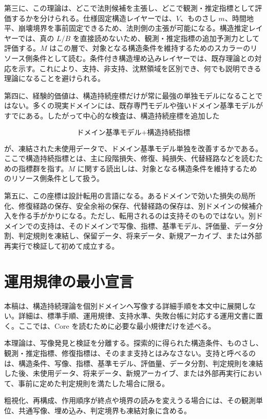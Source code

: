 \documentclass[12pt,a4paper]{article}
\begin{document}
第三に、この理論は、どこで法則候補を主張し、どこで観測・推定指標として評価するかを分けられる。仕様固定構造レイヤーでは、\(V\)、ものさし \(m\)、時間地平、崩壊境界を事前固定できるため、法則側の主張が可能になる。構造推定レイヤーでは、真の \(L/B\) を直接読めないため、観測・推定指標の追加予測力として評価する。\(M\) はこの層で、対象となる構造条件を維持するためのスカラーのリソース側条件として読む。条件付き構造埋め込みレイヤーでは、既存理論との対応を示す。これにより、支持、非支持、沈黙領域を区別でき、何でも説明できる理論になることを避けられる。

第四に、経験的価値は、構造持続座標だけが常に最強の単独モデルになることではない。多くの現実ドメインには、既存専門モデルや強いドメイン基準モデルがすでにある。したがって中心的な検査は、構造持続座標を追加した

\[
\text{ドメイン基準モデル}+\text{構造持続指標}
\]

が、凍結された未使用データで、ドメイン基準モデル単独を改善するかである。ここで構造持続指標とは、主に段階損失、修復、純損失、代替経路などを読むための指標群を指す。\(M\) に関する読出しは、対象となる構造条件を維持するためのリソース側条件として扱う。

第五に、この座標は設計転用の言語になる。あるドメインで効いた損失の局所化、修復経路の保存、安全余裕の保存、代替経路の保存は、別ドメインの候補介入を作る手がかりになる。ただし、転用されるのは支持そのものではない。別ドメインでの支持は、そのドメインで写像、指標、基準モデル、評価量、データ分割、判定規則を凍結し、保留データ、将来データ、新規アーカイブ、または外部再実行で検証して初めて成立する。

\section{運用規律の最小宣言}\label{ux904bux7528ux898fux5f8bux306eux6700ux5c0fux5ba3ux8a00}

本稿は、構造持続理論を個別ドメインへ写像する詳細手順を本文中に展開しない。詳細は、標準手順、運用規律、支持水準、失敗台帳に対応する運用文書に置く。ここでは、Core を読むために必要な最小規律だけを述べる。

本理論は、写像発見と検証を分離する。探索的に得られた構造条件、ものさし、観測・推定指標、修復指標は、そのまま支持とはみなさない。支持と呼べるのは、構造条件、写像、指標、基準モデル、評価量、データ分割、判定規則を凍結した後、未使用データ、将来データ、新規アーカイブ、または外部再実行において、事前に定めた判定規則を満たした場合に限る。

粗視化、再構成、作用順序が終点や境界の読みを変えうる場合には、その観測単位、共通写像、埋め込み、判定境界も凍結対象に含める。
\end{document}
